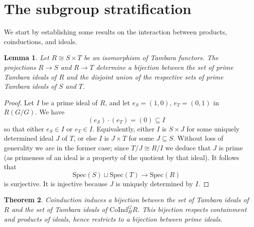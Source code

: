 \documentclass[11pt,dvipsnames]{amsart}
\newtheorem{theorem}{Theorem}[section]
\newtheorem{lemma}[theorem]{Lemma}
\theoremstyle{BoldRemark}
\newcommand{\Spec}{\mathrm{Spec}}
\newcommand{\Coind}{\mathrm{CoInd}}
\renewcommand{\subset}{\subseteq}
\begin{document}
\section{The subgroup stratification}

We start by establishing some results on the interaction between products, coinductions, and ideals.

\begin{lemma}\label{lem:product-induces-bijection-on-Tambara-ideals}
	Let $R \cong S \times T$ be an isomorphism of Tambara functors. The projections $R \rightarrow S$ and $R \rightarrow T$ determine a bijection between the set of prime Tambara ideals of $R$ and the disjoint union of the respective sets of prime Tambara ideals of $S$ and $T$.
\end{lemma}

\begin{proof}
    Let $I$ be a prime ideal of $R$, and let $e_S = (1,0)$, $e_T = (0,1)$ in $R(G/G)$. We have 
    \[ 
        (e_S) \cdot (e_T) = (0) \subset I 
    \] 
    so that either $e_S \in I$ or $e_T \in I$. Equivalently, either $I$ is $S \times J$ for some uniquely determined ideal $J$ of $T$, or else $I$ is $J \times T$ for some $J \subset S$. Without loss of generality we are in the former case; since $T/J \cong R/I$ we deduce that $J$ is prime (as primeness of an ideal is a property of the quotient by that ideal). It follows that 
    \[ 
        \Spec(S) \sqcup \Spec(T) \rightarrow \Spec(R) 
    \] 
    is surjective. It is injective because $J$ is uniquely determined by $I$.
\end{proof}

\begin{theorem}\label{thm:coinduction-induces-bijection-on-Tambara-ideals}
	Coinduction induces a bijection between the set of Tambara ideals of $R$ and the set of Tambara ideals of $\Coind_H^G R$. This bijection respects containment and products of ideals, hence restricts to a bijection between prime ideals.
\end{theorem}
\end{document}
